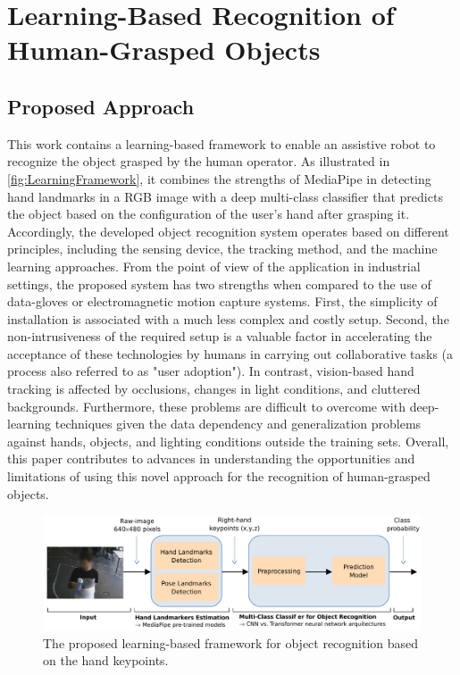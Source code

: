 \section{Learning-Based Recognition of Human-Grasped Objects}

\subsection{Proposed Approach}
\label{subsection:proposal_overview}

This work contains a learning-based framework to enable an assistive robot to recognize the object grasped by the human operator. As illustrated in \autoref{fig:LearningFramework}, it combines the strengths of MediaPipe in detecting hand landmarks in a RGB image with a deep multi-class classifier that predicts the object based on the configuration of the user's hand after grasping it. Accordingly, the developed object recognition system operates based on different principles, including the sensing device, the tracking method, and the machine learning approaches. From the point of view of the application in industrial settings, the proposed system has two strengths when compared to the use of data-gloves or electromagnetic motion capture systems. First, the simplicity of installation is associated with a much less complex and costly setup. Second, the non-intrusiveness of the required setup is a valuable factor in accelerating the acceptance of these technologies by humans in carrying out collaborative tasks (a process also referred to as "user adoption"). In contrast, vision-based hand tracking is affected by occlusions, changes in light conditions, and cluttered backgrounds. Furthermore, these problems are difficult to overcome with deep-learning techniques given the data dependency and generalization problems against hands, objects, and lighting conditions outside the training sets. Overall, this paper contributes to advances in understanding the opportunities and limitations of using this novel approach for the recognition of human-grasped objects.

\begin{figure}[ht]
    \centering
    \includegraphics[width=1\columnwidth]{figs/LearningFrameworkB.pdf}
    \caption{The proposed learning-based framework for object recognition based on the hand keypoints.}
    \label{fig:LearningFramework}
\end{figure}

